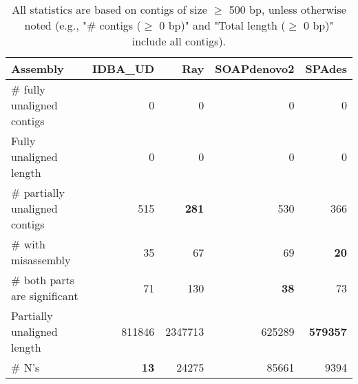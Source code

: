 \documentclass[12pt,a4paper]{article}
\begin{document}
\begin{table}[ht]
\begin{center}
\caption{All statistics are based on contigs of size $\geq$ 500 bp, unless otherwise noted (e.g., "\# contigs ($\geq$ 0 bp)" and "Total length ($\geq$ 0 bp)" include all contigs).}
\begin{tabular}{|l*{4}{|r}|}
\hline
Assembly & IDBA\_UD & Ray & SOAPdenovo2 & SPAdes \\ \hline
\# fully unaligned contigs & 0 & 0 & 0 & 0 \\ \hline
Fully unaligned length & 0 & 0 & 0 & 0 \\ \hline
\# partially unaligned contigs & 515 & {\bf 281} & 530 & 366 \\ \hline
\hspace{5mm}\# with misassembly & 35 & 67 & 69 & {\bf 20} \\ \hline
\hspace{5mm}\# both parts are significant & 71 & 130 & {\bf 38} & 73 \\ \hline
Partially unaligned length & 811846 & 2347713 & 625289 & {\bf 579357} \\ \hline
\# N's & {\bf 13} & 24275 & 85661 & 9394 \\ \hline
\end{tabular}
\end{center}
\end{table}
\end{document}

